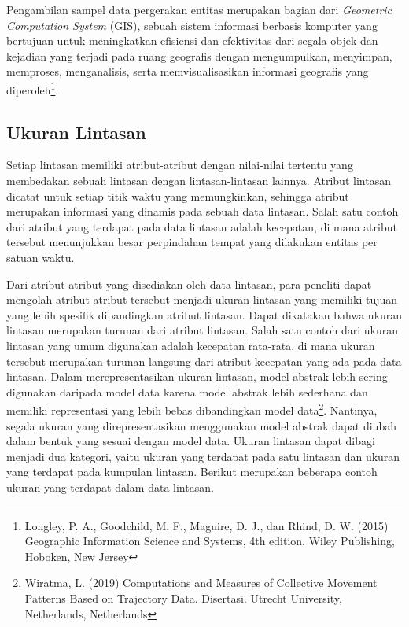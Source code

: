 \documentclass[a4paper,twoside]{article}
\begin{document}
Pengambilan sampel data pergerakan entitas merupakan bagian dari \textit{Geometric Computation System} (GIS), sebuah sistem informasi berbasis komputer yang bertujuan untuk meningkatkan efisiensi dan efektivitas dari segala objek dan kejadian yang terjadi pada ruang geografis dengan mengumpulkan, menyimpan, memproses, menganalisis, serta memvisualisasikan informasi geografis yang diperoleh\footnote{Longley, P. A., Goodchild, M. F., Maguire, D. J., dan Rhind, D. W. (2015) Geographic Information Science and Systems, 4th edition. Wiley Publishing, Hoboken, New Jersey}.

\subsection{Ukuran Lintasan}

Setiap lintasan memiliki atribut-atribut dengan nilai-nilai tertentu yang membedakan sebuah lintasan dengan lintasan-lintasan lainnya. Atribut lintasan dicatat untuk setiap titik waktu yang memungkinkan, sehingga atribut merupakan informasi yang dinamis pada sebuah data lintasan. Salah satu contoh dari atribut yang terdapat pada data lintasan adalah kecepatan, di mana atribut tersebut menunjukkan besar perpindahan tempat yang dilakukan entitas per satuan waktu.

Dari atribut-atribut yang disediakan oleh data lintasan, para peneliti dapat mengolah atribut-atribut tersebut menjadi ukuran lintasan yang memiliki tujuan yang lebih spesifik dibandingkan atribut lintasan. Dapat dikatakan bahwa ukuran lintasan merupakan turunan dari atribut lintasan. Salah satu contoh dari ukuran lintasan yang umum digunakan adalah kecepatan rata-rata, di mana ukuran tersebut merupakan turunan langsung dari atribut kecepatan yang ada pada data lintasan. Dalam merepresentasikan ukuran lintasan, model abstrak lebih sering digunakan daripada model data karena model abstrak lebih sederhana dan memiliki representasi yang lebih bebas dibandingkan model data\footnote{Wiratma, L. (2019) Computations and Measures of Collective Movement Patterns Based on Trajectory Data. Disertasi. Utrecht University, Netherlands, Netherlands}. Nantinya, segala ukuran yang direpresentasikan menggunakan model abstrak dapat diubah dalam bentuk yang sesuai dengan model data. Ukuran lintasan dapat dibagi menjadi dua kategori, yaitu ukuran yang terdapat pada satu lintasan dan ukuran yang terdapat pada kumpulan lintasan. Berikut merupakan beberapa contoh ukuran yang terdapat dalam data lintasan.
\end{document}
